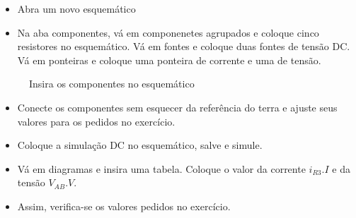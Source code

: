 \begin{itemize}
\item Abra um novo esquemático
\end{itemize}


\begin{itemize}
  \item Na aba componentes, vá em componenetes agrupados e coloque cinco resistores no esquemático. Vá em fontes e coloque duas fontes de tensão DC. Vá em ponteiras e coloque uma ponteira de corrente e uma de tensão.
\end{itemize}

\begin{figure}[H]
  \caption{Insira os componentes no esquemático}
  \label{fig:comp_th_nt}
\end{figure}

\begin{itemize}
  \item Conecte os componentes sem esquecer da referência do terra e ajuste seus valores para os pedidos no exercício.
\end{itemize}


\begin{itemize}
  \item Coloque a simulação DC no esquemático, salve e simule.
\end{itemize}


\begin{itemize}
  \item Vá em diagramas e insira uma tabela. Coloque o valor da corrente $i_{R3}.I$ e da tensão $V_{AB}.V$.
\end{itemize}


\begin{itemize}
  \item Assim, verifica-se os valores pedidos no exercício.
\end{itemize}

